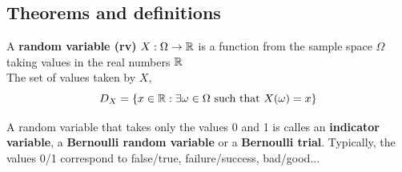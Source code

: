 \documentclass[12pt,a4paper]{article}
\begin{document}
\subsection{Theorems and definitions}

 A \textbf{random variable (rv)} $X : \Omega \to \mathbb{R}$ is a function from the sample space $\Omega$ taking values in the real numbers $\mathbb{R}$\\

 The set of values taken by $X$, 
\begin{equation}
    D_X = \{x \in \mathbb{R} : \exists \omega \in \Omega \text{ such that } X(\omega) = x\}
\end{equation}

 A random variable that takes only the values 0 and 1 is calles an \textbf{indicator variable}, a \textbf{Bernoulli random variable} or a \textbf{Bernoulli trial}. Typically, the values 0/1 correspond to false/true, failure/success, bad/good...
\end{document}
